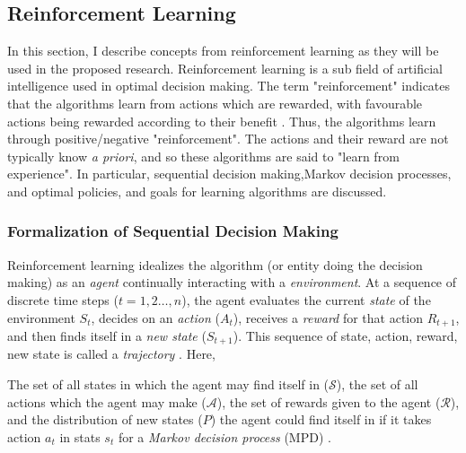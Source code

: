 \subsection{Reinforcement Learning}

In this section, I describe concepts from reinforcement learning as they will be used in the proposed research.  Reinforcement learning is a sub field of artificial intelligence used in optimal decision making. The term "reinforcement" indicates that the algorithms learn from actions which are rewarded, with favourable actions being rewarded according to their benefit \cite{sutton2011reinforcement}.  Thus, the algorithms learn through positive/negative "reinforcement".  The actions and their reward are not typically know \textit{a priori}, and so these algorithms are said to "learn from experience".  In particular, sequential decision making,Markov decision processes, and optimal policies, and goals for learning algorithms are discussed.

\subsubsection{Formalization of Sequential Decision Making}

Reinforcement learning idealizes the algorithm (or entity doing the decision making) as an \textit{agent} continually interacting with a \textit{environment}.  At a sequence of discrete time steps  (${ t =1, 2 \dots, n} $), the agent evaluates the current \textit{state} of the environment $ S_t $, decides on an \textit{action} ($ A_t $), receives a \textit{reward} for that action $ R_{t+1} $, and then finds itself in a \textit{new state} ($ S_{t+1} $).  This sequence of state, action, reward, new state is called a \textit{trajectory} \cite{sutton2011reinforcement,lizotte2017reinforcement}.  Here, 

The set of all states in which the agent may find itself in ($\mathcal{S}$), the set of all actions which the agent may make ($\mathcal{A}$), the set of rewards given to the agent ($ \mathcal{R} $), and the distribution of new states ($ P $) the agent could find itself in if it takes action $ a_t $ in stats $ s_t $ for a \textit{Markov decision process} (MPD) \cite{sutton2011reinforcement,lizotte2017reinforcement}.


